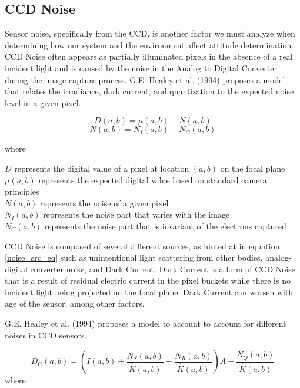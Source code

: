 \subsection{CCD Noise}
\par \qquad Sensor noise, specifically from the CCD, is another factor we must analyze when determining how our system and the environment affect attitude determination.
CCD Noise often appears as partially illuminated pixels in the absence of a real incident light and is caused by the noise in the Analog to Digital Converter during the image capture process.
G.E. Healey et al. (1994) proposes a model that relates the irradiance, dark current, and quantization to the expected noise level in a given pixel\cite{radiometric_ccd_camera_calibration}.

\begin{equation}
    D(a,b) = \mu(a,b) + N(a,b)
\end{equation}
\begin{equation} \label{noise_src_eq}
    N(a,b) = N_I(a,b) + N_C(a,b)
\end{equation}

where
\begin{center}
    $D$ represents the digital value of a pixel at location $(a,b)$ on the focal plane\\
    $\mu(a,b)$ represents the expected digital value based on standard camera principles\\
    $N(a,b)$ represents the noise of a given pixel\\
    $N_I(a,b)$ represents the noise part that varies with the image\\
    $N_C(a,b)$ represents the noise part that is invariant of the electrons captured
\end{center}

CCD Noise is composed of several different sources, as hinted at in equation \ref{noise_src_eq} such as unintentional light scattering from other bodies, analog-digital converter noise, and Dark Current.
Dark Current is a form of CCD Noise that is a result of residual electric current in the pixel buckets while there is no incident light being projected on the focal plane.
Dark Current can worsen with age of the sensor, among other factors.

\par \qquad G.E. Healey et al. (1994) proposes a model to account to account for different noises in CCD sensors.

\begin{equation} \label{noise_correction_eq}
    D_C(a,b) = \left( I(a,b) + \frac{N_S(a,b)}{\hat{K}(a,b)} + \frac{N_R(a,b)}{\hat{K}(a,b)} \right)A + \frac{N_Q(a,b)}{\hat{K}(a,b)}
\end{equation}
where

